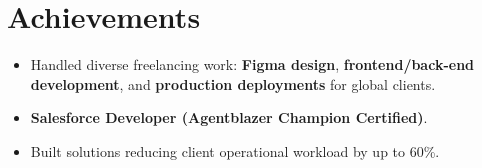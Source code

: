 \documentclass[letterpaper,11pt]{article}
\newcommand{\achievementItem}[1]{\item\small{#1 \vspace{-6pt}}}
\begin{document}
\section{Achievements}
\begin{itemize}[leftmargin=0.15in]
  \achievementItem{Handled diverse freelancing work: \textbf{Figma design}, \textbf{frontend/back-end development}, and \textbf{production deployments} for global clients.}
  \achievementItem{\textbf{Salesforce Developer (Agentblazer Champion Certified)}.}
  \achievementItem{Built solutions reducing client operational workload by up to 60\%.}
\end{itemize}
\end{document}
